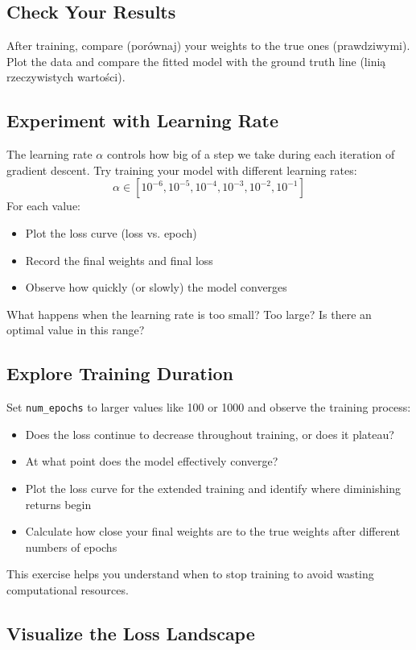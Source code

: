 \documentclass{article}
\begin{document}
\newpage
\subsection{ Check Your Results}
After training, compare (porównaj) your weights to the true ones (prawdziwymi). Plot the data and compare the fitted model with the ground truth line (linią rzeczywistych wartości).

\subsection{ Experiment with Learning Rate}
The learning rate \( \alpha \) controls how big of a step we take during each iteration of gradient descent. Try training your model with different learning rates: 
\[
\alpha \in [10^{-6}, 10^{-5}, 10^{-4}, 10^{-3}, 10^{-2}, 10^{-1}]
\]
For each value:
\begin{itemize}
    \item Plot the loss curve (loss vs. epoch)
    \item Record the final weights and final loss
    \item Observe how quickly (or slowly) the model converges
\end{itemize}

What happens when the learning rate is too small? Too large? Is there an optimal value in this range?

\subsection{ Explore Training Duration}
Set \texttt{num\_epochs} to larger values like 100 or 1000 and observe the training process:
\begin{itemize}
    \item Does the loss continue to decrease throughout training, or does it plateau?
    \item At what point does the model effectively converge?
    \item Plot the loss curve for the extended training and identify where diminishing returns begin
    \item Calculate how close your final weights are to the true weights after different numbers of epochs
\end{itemize}

This exercise helps you understand when to stop training to avoid wasting computational resources.

\newpage
\subsection{Visualize the Loss Landscape}
\end{document}
